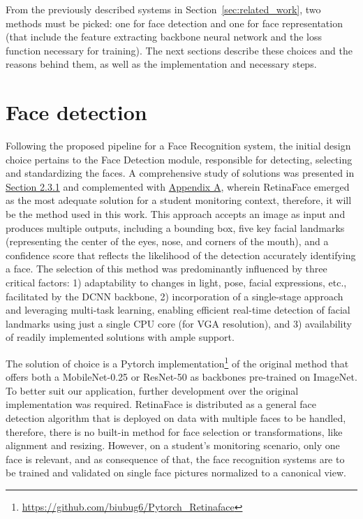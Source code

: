 \documentclass[class=report, crop=false, a4paper, 12pt]{standalone}
\begin{document}
\par From the previously described systems in Section~\ref{sec:related_work}, two methods must be picked: one for face detection and one for face representation (that include the feature extracting backbone neural network and the loss function necessary for training). The next sections describe these choices and the reasons behind them, as well as the implementation and necessary steps.

\section{Face detection}
\par Following the proposed pipeline for a Face Recognition system, the initial design choice pertains to the Face Detection module, responsible for detecting, selecting and standardizing the faces. A comprehensive study of solutions was presented in \hyperref[sec:face_detect]{Section 2.3.1} and complemented with \hyperref[appendix:face_detection_appendix]{Appendix A}, wherein RetinaFace emerged as the most adequate solution for a student monitoring context, therefore, it will be the method used in this work. This approach accepts an image as input and produces multiple outputs, including a bounding box, five key facial landmarks (representing the center of the eyes, nose, and corners of the mouth), and a confidence score that reflects the likelihood of the detection accurately identifying a face. The selection of this method was predominantly influenced by three critical factors: 1) adaptability to changes in light, pose, facial expressions, etc., facilitated by the DCNN backbone, 2) incorporation of a single-stage approach and leveraging multi-task learning, enabling efficient real-time detection of facial landmarks using just a single CPU core (for VGA resolution), and 3) availability of readily implemented solutions with ample support.

\par The solution of choice is a Pytorch implementation\footnote{\url{https://github.com/biubug6/Pytorch_Retinaface}} of the original method that offers both a MobileNet-0.25 or ResNet-50 as backbones pre-trained on ImageNet. To better suit our application, further development over the original implementation was required. RetinaFace is distributed as a general face detection algorithm that is deployed on data with multiple faces to be handled, therefore, there is no built-in method for face selection or transformations, like alignment and resizing. However, on a student's monitoring scenario, only one face is relevant, and as consequence of that, the face recognition systems are to be trained and validated on single face pictures normalized to a canonical view.
\end{document}
